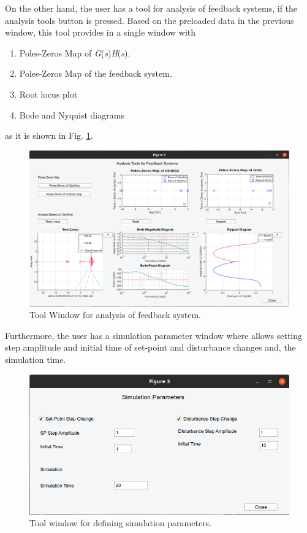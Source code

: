 On the other hand, the user has a tool for analysis of feedback systems, if the analysis tools button is pressed. Based on the preloaded data in the previous window, this tool provides in a single window with
\begin{enumerate}
	\item Poles-Zeros Map of \textit{G}(\textit{s})\textit{H}(\textit{s}).
	\item Poles-Zeros Map of the feedback system.
	\item Root locus plot
	\item Bode and Nyquist diagrams
\end{enumerate}
as it is shown in Fig. \ref{chp_lc_fig03_Gcl}.

\begin{figure}[H]
	\centering
	\includegraphics[scale=0.5]{./figuras/chapter_glc/fig03_ejemGcl.png}
	\caption{Tool Window for analysis of feedback system.}
	\label{chp_lc_fig03_Gcl}
\end{figure}

Furthermore, the user has a simulation parameter window where allows setting step amplitude and initial time of set-point and disturbance changes and, the simulation time.

\begin{figure}[H]
	\centering
	\includegraphics[scale=0.5]{./figuras/chapter_glc/fig04_ejemGcl.png}
	\caption{Tool window for defining simulation parameters.}
	\label{chp_lc_fig04_Gcl}
\end{figure}



